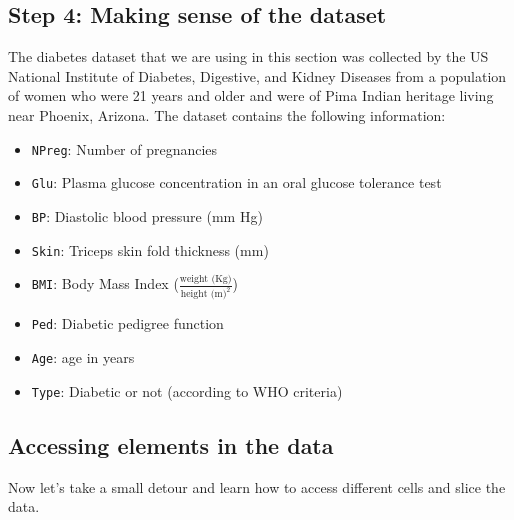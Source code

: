 \documentclass[
  letterpaper,
]{book}
\providecommand{\tightlist}{%
  \setlength{\itemsep}{0pt}\setlength{\parskip}{0pt}}\usepackage{longtable,booktabs,array}
\begin{document}
\hypertarget{step-4-making-sense-of-the-dataset}{%
\subsection*{Step 4: Making sense of the
dataset}\label{step-4-making-sense-of-the-dataset}}

The diabetes dataset that we are using in this section was collected by
the US National Institute of Diabetes, Digestive, and Kidney Diseases
from a population of women who were 21 years and older and were of Pima
Indian heritage living near Phoenix, Arizona. The dataset contains the
following information:

\begin{itemize}
\tightlist
\item
  \texttt{NPreg}: Number of pregnancies
\item
  \texttt{Glu}: Plasma glucose concentration in an oral glucose
  tolerance test
\item
  \texttt{BP}: Diastolic blood pressure (mm Hg)
\item
  \texttt{Skin}: Triceps skin fold thickness (mm)
\item
  \texttt{BMI}: Body Mass Index
  (\(\frac{\text{weight (Kg)}}{\text{height (m)}^2}\))
\item
  \texttt{Ped}: Diabetic pedigree function
\item
  \texttt{Age}: age in years
\item
  \texttt{Type}: Diabetic or not (according to WHO criteria)
\end{itemize}

\hypertarget{accessing-elements-in-the-data}{%
\subsection*{Accessing elements in the
data}\label{accessing-elements-in-the-data}}

Now let's take a small detour and learn how to access different cells
and slice the data.
\end{document}
